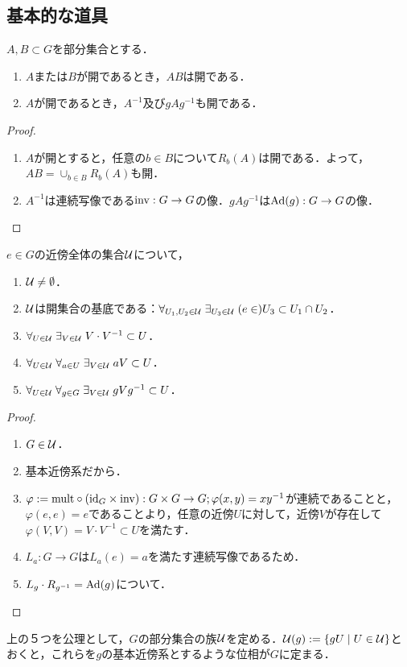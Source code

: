 \documentclass[uplatex,dvipdfmx]{jsreport}
\begin{document}
\subsection{基本的な道具}

\begin{lemma}
    $A,B\subset G$を部分集合とする．
    \begin{enumerate}
        \item $A$または$B$が開であるとき，$AB$は開である．
        \item $A$が開であるとき，$A^{-1}$及び$gAg^{-1}$も開である．
    \end{enumerate}
\end{lemma}
\begin{proof}\mbox{}
    \begin{enumerate}
        \item $A$が開とすると，任意の$b\in B$について$R_b(A)$は開である．よって，$AB=\cup_{b\in B}R_b(A)$も開．
        \item $A^{-1}$は連続写像である$\mathrm{inv}:G\to G$の像．$gAg^{-1}$は$\mathrm{Ad}(g):G\to G$の像．
    \end{enumerate}
\end{proof}

\begin{lemma}[使える連続写像のレパートリー]\label{lemma-morphism-toolset-for-topological-group}
    $e\in G$の近傍全体の集合$\mathcal{U}$について，
    \begin{enumerate}
        \item $\mathcal{U}\ne\emptyset$．
        \item $\mathcal{U}$は開集合の基底である：$\forall_{U_1,U_2\in\mathcal{U}}\;\exists_{U_3\in\mathcal{U}}\;(e\in)U_3\subset U_1\cap U_2$．
        \item $\forall_{U\in\mathcal{U}}\;\exists_{V\in\mathcal{U}}\;V\cdot V^{-1}\subset U$．
        \item $\forall_{U\in\mathcal{U}}\;\forall_{a\in U}\;\exists_{V\in\mathcal{U}}\;aV\subset U$．
        \item $\forall_{U\in\mathcal{U}}\;\forall_{g\in G}\;\exists_{V\in\mathcal{U}}\;gVg^{-1}\subset U$．
    \end{enumerate}
\end{lemma}
\begin{proof}\mbox{}
    \begin{enumerate}
        \item $G\in\mathcal{U}$．
        \item 基本近傍系だから．
        \item $\varphi:=\mathrm{mult}\circ(\mathrm{id}_G\times\mathrm{inv}):G\times G\to G;\varphi(x,y)=xy^{-1}$が連続であることと，$\varphi(e,e)=e$であることより，任意の近傍$U$に対して，近傍$V$が存在して$\varphi(V,V)=V\cdot V^{-1}\subset U$を満たす．
        \item $L_a:G\to G$は$L_a(e)=a$を満たす連続写像であるため．
        \item $L_g\cdot R_{g^{-1}}=\mathrm{Ad}(g)$について．
    \end{enumerate}
\end{proof}
\begin{remark}
    上の５つを公理として，$G$の部分集合の族$\mathcal{U}$を定める．$\mathcal{U}(g):=\left\{gU\mid U\in\mathcal{U}\right\}$とおくと，これらを$g$の基本近傍系とするような位相が$G$に定まる．
\end{remark}
\end{document}
